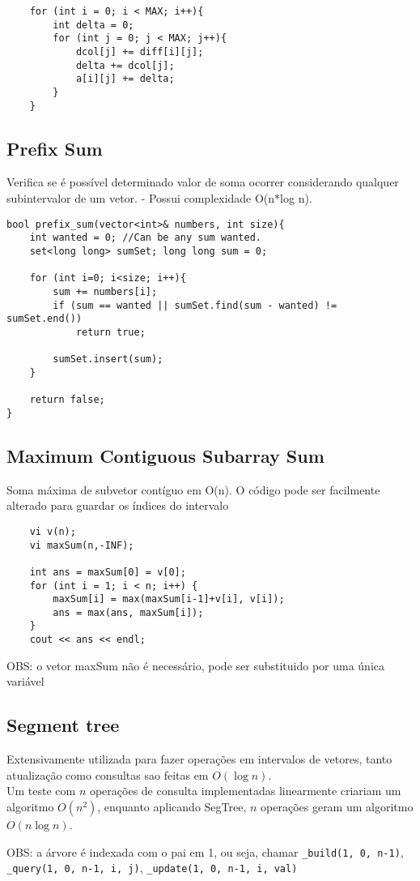 \begin{verbatim}
    for (int i = 0; i < MAX; i++){
        int delta = 0;
        for (int j = 0; j < MAX; j++){
            dcol[j] += diff[i][j];
            delta += dcol[j];
            a[i][j] += delta;
        }
    }
\end{verbatim}

\subsection{Prefix Sum}
    Verifica se é possível determinado valor de soma ocorrer considerando qualquer subintervalor de um vetor.
    - Possui complexidade O(n*log n).

\begin{verbatim}
bool prefix_sum(vector<int>& numbers, int size){
    int wanted = 0; //Can be any sum wanted.
    set<long long> sumSet; long long sum = 0; 

    for (int i=0; i<size; i++){
        sum += numbers[i];
        if (sum == wanted || sumSet.find(sum - wanted) != sumSet.end())
            return true;

        sumSet.insert(sum);
    }
    
    return false;
}
\end{verbatim}

\subsection{Maximum Contiguous Subarray Sum}

Soma máxima de subvetor contíguo em O(n). O código pode ser facilmente alterado para guardar os índices do intervalo

\begin{verbatim}
    vi v(n);
    vi maxSum(n,-INF);

    int ans = maxSum[0] = v[0];
    for (int i = 1; i < n; i++) {
        maxSum[i] = max(maxSum[i-1]+v[i], v[i]);
        ans = max(ans, maxSum[i]);
    }
    cout << ans << endl;

\end{verbatim}OBS: o vetor maxSum não é necessário, pode ser substituido por uma única variável




\subsection{Segment tree}
\par Extensivamente utilizada para fazer operações em intervalos de vetores, tanto atualização como consultas sao feitas em $O(\log n)$. \\
Um teste com $n$ operações de consulta implementadas linearmente criariam um algoritmo $O(n^2)$, enquanto aplicando SegTree, $n$ operações geram um algoritmo $O(n\log n)$.
\par OBS: a árvore é indexada com o pai em 1, ou seja, chamar \lstinline{_build(1, 0, n-1)}, \lstinline{_query(1, 0, n-1, i, j)}, \lstinline{_update(1, 0, n-1, i, val)}

